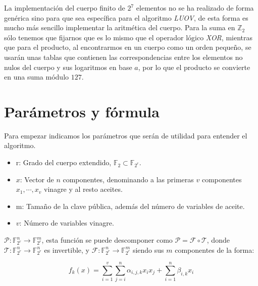 \documentclass[11pt]{article}
\begin{document}
La implementación del cuerpo finito de $2^7$ elementos no se ha realizado de forma genérica sino para que sea específica para el algoritmo \textit{LUOV}, de esta forma es mucho más sencillo implementar la aritmética del cuerpo. Para la suma en $\mathds{Z}_2$ sólo tenemos que fijarnos que es lo mismo que el operador lógico \textit{XOR}, mientras que para el producto, al encontrarmos en un cuerpo como un orden pequeño, se usarán unas tablas que contienen las correspondencias entre los elementos no nulos del cuerpo y sus logaritmos en base $a$, por lo que el producto se convierte en una suma módulo $127$.




\section{Parámetros y fórmula}
Para empezar indicamos los parámetros que serán de utilidad para entender el algoritmo.
\begin{itemize}
	\item r: Grado del cuerpo extendido, $\mathds{F}_2 \subset \mathds{F}_{2^r}$. %
	\item $x$: Vector de $n$ componentes, denominando a las primeras $v$ componentes  $x_1, \dotsb, x_v$ vinagre y al resto aceites.
	
	\item m: Tamaño de la clave pública, además del número de variables de aceite.
	\item $v$: Número de variables vinagre.
\end{itemize}

$\mathcal{P}: \mathds{F}_{2^r}^n \rightarrow \mathds{F}_{2^r}^m$, esta función se puede descomponer como $\mathcal{P} = \mathcal{F} \circ \mathcal{T}$, donde $\mathcal{T}: \mathds{F}_{2^r}^n \rightarrow \mathds{F}_{2^r}^n$ es invertible, y $\mathcal{F}: \mathds{F}_{2^r}^n \rightarrow \mathds{F}_{2^r}^m$ siendo sus $m$ componentes de la forma:

\begin{equation}\label{eq:fun}
f_k(x) = \sum_{i=1}^v \sum_{j=i}^n \alpha_{i,j,k} x_i x_j + \sum_{i=1}^n \beta_{i,k} x_i
\end{equation}
\end{document}
